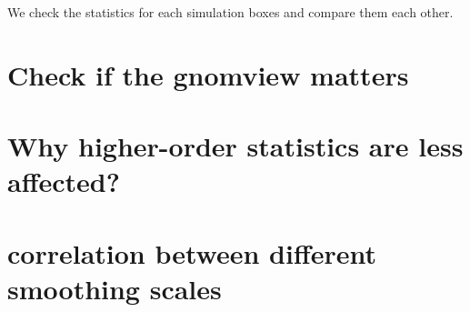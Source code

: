 We check the statistics for each simulation boxes and compare them each other.



\section{Check if the gnomview matters}

\section{Why higher-order statistics are less affected?}

\section{correlation between different smoothing scales}




